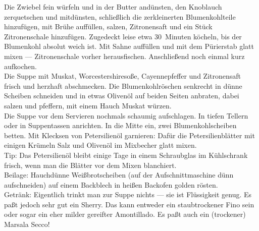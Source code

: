       \begin{zubereitung}
        Die Zwiebel fein würfeln und in der Butter andünsten, den Knoblauch
	zerquetschen und mitdünsten, schließlich die zerkleinerten
	Blumenkohlteile hinzufügen, mit Brühe auffüllen, salzen, Zitronensaft
	und ein Stück Zitronenschale hinzufügen. Zugedeckt leise etwa
	30~Minuten köcheln, bis der Blumenkohl absolut weich ist. Mit Sahne
	auffüllen und mit dem Pürierstab glatt mixen --- Zitronenschale vorher
	herausfischen. Anschließend noch einmal kurz aufkochen. \\
        Die Suppe mit Muskat, Worcestershiresoße, Cayennepfeffer und
	Zitronensaft frisch und herzhaft abschmecken. Die Blumenkohlröschen
	senkrecht in dünne Scheiben schneiden und in etwas Olivenöl auf beiden
	Seiten anbraten, dabei salzen und pfeffern, mit einem Hauch Muskat
	würzen. \\
        Die Suppe vor dem Servieren nochmals schaumig aufschlagen. In tiefen
	Tellern oder in Suppentassen anrichten. In die Mitte ein, zwei
	Blumenkohlscheiben betten. Mit Klecksen von Petersilienöl garnieren:
	Dafür die Petersilienblätter mit einigen Krümeln Salz und Olivenöl im
	Mixbecher glatt mixen. \\
        Tip: Das Petersilienöl bleibt einige Tage in einem Schraubglas im
	Kühlschrank frisch, wenn man die Blätter vor dem Mixen blanchiert. \\
        Beilage: Hauchdünne Weißbrotscheiben (auf der Aufschnittmaschine dünn
	aufschneiden) auf einem Backblech in  heißen Backofen golden
	rösten. \\
        Getränk: Eigentlich trinkt man zur Suppe nichts --- sie ist Flüssigkeit
	genug. Es paßt jedoch sehr gut ein Sherry. Das kann entweder ein
	staubtrockener Fino sein oder sogar ein eher milder gereifter
	Amontillado. Es paßt auch ein (trockener) Marsala Secco! \\
      \end{zubereitung}



